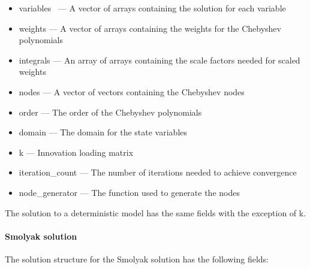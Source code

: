 \documentclass[notitlepage,11pt]{article}
\begin{document}
\begin{itemize}
\item variables \ --- A vector of arrays containing the solution for each
variable

\item weights --- A vector of arrays containing the weights for the
Chebyshev polynomials

\item integrals --- An array of arrays containing the scale factors needed
for scaled weights

\item nodes --- A vector of vectors containing the Chebyshev nodes

\item order --- The order of the Chebyshev polynomials

\item domain --- The domain for the state variables

\item k --- Innovation loading matrix

\item iteration\_count --- The number of iterations needed to achieve
convergence

\item node\_generator --- The function used to generate the nodes
\end{itemize}

The solution to a deterministic model has the same fields with the exception
of k.

\paragraph{Smolyak solution}

The solution structure for the Smolyak solution has the following fields:
\end{document}

